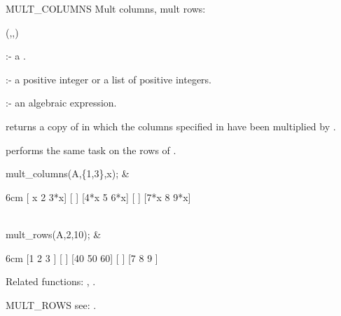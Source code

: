 \begin{Operator}[multcolumns]{MULT_COLUMNS}
Mult columns, mult rows:

\begin{Syntax}
(,,)
\end{Syntax}

       :- a . 

 :- a positive integer or a list of positive 
                       integers. 

         :- an algebraic expression.

 returns a copy of  in which the 
columns specified in  have been multiplied by 
. 

 performs the same task on the rows of .

\begin{Examples}

mult_columns(A,\{1,3\},x); &
\begin{multilineoutput}{6cm}
[ x   2  3*x]
[           ]
[4*x  5  6*x]
[           ]
[7*x  8  9*x]
\end{multilineoutput}\\

mult_rows(A,2,10); &
\begin{multilineoutput}{6cm}
[1   2   3 ]
[          ]
[40  50  60]
[          ]
[7   8   9 ]
\end{multilineoutput}

\end{Examples}

Related functions: , .

\end{Operator}


\begin{Operator}[multrows]{MULT_ROWS}
see:  .
\end{Operator}


